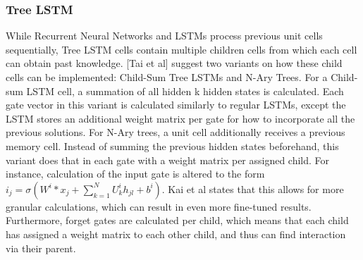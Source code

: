 \subsubsection{Tree LSTM}
While Recurrent Neural Networks and LSTMs process previous unit cells
sequentially, Tree LSTM cells \cite{DBLP:journals/corr/TaiSM15}
\cite{DBLP:journals/corr/ZhuSG15} \cite{DBLP:journals/corr/LeZ15} contain
multiple children cells from which each cell can obtain past knowledge. [Tai et
al] suggest two variants on how these child cells can be implemented: Child-Sum
Tree LSTMs and N-Ary Trees. For a Child-sum LSTM cell, a summation of all hidden
k hidden states is calculated. Each gate vector in this variant is calculated
similarly to regular LSTMs, except the LSTM stores an additional weight matrix
per gate for how to incorporate all the previous solutions. For N-Ary trees, a
unit cell additionally receives a previous memory cell. Instead of summing the
previous hidden states beforehand, this variant does that in each gate with a
weight matrix per assigned child. For instance, calculation of the input gate is
altered to the form $i_j=\sigma(W^i*x_j +
\sum\limits_{k=1}^{N}U_k^{i}h_{jl}+b^i)$. Kai et al states that this allows for
more granular calculations, which can result in even more fine-tuned results.
Furthermore, forget gates are calculated per child, which means that each child
has assigned a weight matrix to each other child, and thus can find interaction
via their parent. 